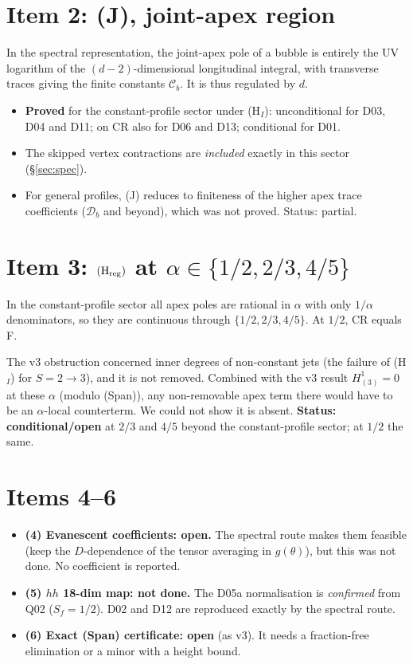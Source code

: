 \documentclass[11pt]{article}
\theoremstyle{definition}
\newcommand{\Hreg}{(\mathrm H_{\rm reg})}
\newcommand{\Ccb}{\mathcal C}
\begin{document}
\section{Item 2: (J), joint-apex region}
In the spectral representation, the joint-apex pole of a bubble is entirely the UV logarithm of the $(d-2)$-dimensional longitudinal integral, with transverse traces giving the finite constants $\Ccb_b$. It is thus regulated by $d$.
\begin{itemize}
\item \textbf{Proved} for the constant-profile sector under (H$_I$): unconditional for D03, D04 and D11; on CR also for D06 and D13; conditional for D01.
\item The skipped vertex contractions are \emph{included} exactly in this sector (\S\ref{sec:spec}).
\item For general profiles, (J) reduces to finiteness of the higher apex trace coefficients ($\mathcal D_b$ and beyond), which was not proved. Status: partial.
\end{itemize}

\section{Item 3: $\Hreg$ at $\alpha\in\{1/2,2/3,4/5\}$}
In the constant-profile sector all apex poles are rational in $\alpha$ with only $1/\alpha$ denominators, so they are continuous through $\{1/2,2/3,4/5\}$. At $1/2$, CR equals F.

The v3 obstruction concerned inner degrees of non-constant jets (the failure of (H$_I$) for $S=2\to3$), and it is not removed. Combined with the v3 result $H^1_{(3)}=0$ at these $\alpha$ (modulo (Span)), any non-removable apex term there would have to be an $\alpha$-local counterterm. We could not show it is absent. \textbf{Status: conditional/open} at $2/3$ and $4/5$ beyond the constant-profile sector; at $1/2$ the same.

\section{Items 4--6}
\begin{itemize}
\item \textbf{(4) Evanescent coefficients: open.} The spectral route makes them feasible (keep the $D$-dependence of the tensor averaging in $g(\theta)$), but this was not done. No coefficient is reported.
\item \textbf{(5) $hh$ 18-dim map: not done.} The D05a normalisation is \emph{confirmed} from Q02 ($S_f=1/2$). D02 and D12 are reproduced exactly by the spectral route.
\item \textbf{(6) Exact (Span) certificate: open} (as v3). It needs a fraction-free elimination or a minor with a height bound.
\end{itemize}
\end{document}
